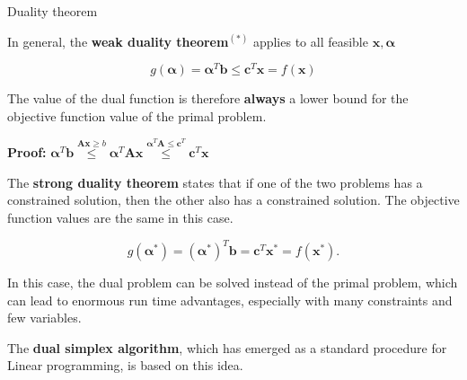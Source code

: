 \documentclass[11pt,compress,t,notes=noshow, xcolor=table]{beamer}
\begin{document}
\begin{vbframe}{Duality theorem}

In general, the \textbf{weak duality theorem}$^{(*)}$ applies to all feasible $\bm{x}, \bm{\alpha}$

$$
g(\bm{\alpha}) = \bm{\alpha}^T\bm{b} \le \bm{c}^T\bm{x}  = f(\bm{x})
$$

The value of the dual function is therefore \textbf{always} a lower bound for the objective function value of the primal problem.

\lz

\textbf{Proof:}
$\bm{\alpha}^T\bm{b} \overset{\bm{Ax} \ge b}{\le}\bm{\alpha}^T\bm{Ax} \overset{\bm{\alpha}^T\bm{A} \le \bm{c}^T}{\le}\bm{c}^T\bm{x}$

\framebreak

The \textbf{strong duality theorem} states that if one of the two problems has a constrained solution, then the other also has a constrained solution. The objective function values are the same in this case.

$$
g(\bm{\alpha}^*) = (\bm{\alpha}^*)^T\bm{b} = \bm{c}^T\bm{x}^* = f(\bm{x}^*).
$$

In this case, the dual problem can be solved instead of the primal problem, which can lead to enormous run time advantages, especially with many constraints and few variables.

\lz

The \textbf{dual simplex algorithm}, which has emerged as a standard procedure for Linear programming, is based on this idea.

\end{vbframe}
\end{document}
